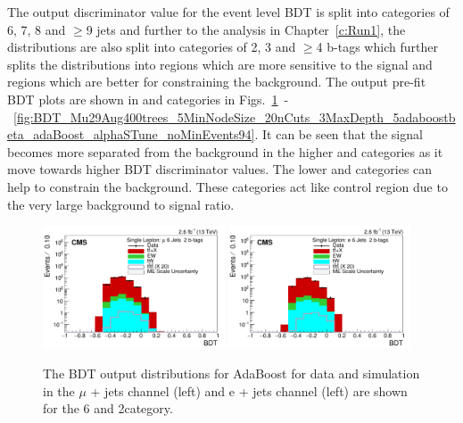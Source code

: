The output discriminator value for the event level BDT is split into \njets categories of 6, 7, 8 and $\geq$9 jets and further to the \runone analysis in Chapter~\ref{c:Run1}, the distributions are also split into \nMtags categories of 2, 3 and $\geq$4 b-tags which further splits the distributions into regions which are more sensitive to the signal and regions which are better for constraining the background.
The output pre-fit BDT plots are shown in \njets and \nMtags categories in Figs.~\ref{fig:BDT_Mu29Aug400trees_5MinNodeSize_20nCuts_3MaxDepth_5adaboostbeta_adaBoost_alphaSTune_noMinEvents62}~-~\ref{fig:BDT_Mu29Aug400trees_5MinNodeSize_20nCuts_3MaxDepth_5adaboostbeta_adaBoost_alphaSTune_noMinEvents94}. It can be seen that the signal becomes more separated from the background in the higher \njets and \nMtags categories as it move towards higher BDT discriminator values. The lower \njets and \nMtags categories can help to constrain the \ttbar background. These categories act like control region due to the very large background to signal ratio.

\begin{figure}[ht!]
    \includegraphics[width=0.48\textwidth]{images/Run2/BDT_Mu29Aug400trees_5MinNodeSize_20nCuts_3MaxDepth_5adaboostbeta_adaBoost_alphaSTune_noMinEvents6nJets2nMtags_StackLogY.pdf}
    \includegraphics[width=0.48\textwidth]{images/Run2/BDT_El29Aug400trees_5MinNodeSize_20nCuts_3MaxDepth_5adaboostbeta_adaBoost_alphaSTune_noMinEvents6nJets2nMtags_StackLogY.pdf} 
    \caption{The BDT output distributions for AdaBoost for data and simulation in the $\mu$ + jets channel (left) and e + jets channel (left) are shown for the 6 \njets and 2\nMtags category.}
    \label{fig:BDT_Mu29Aug400trees_5MinNodeSize_20nCuts_3MaxDepth_5adaboostbeta_adaBoost_alphaSTune_noMinEvents62}
\end{figure}

